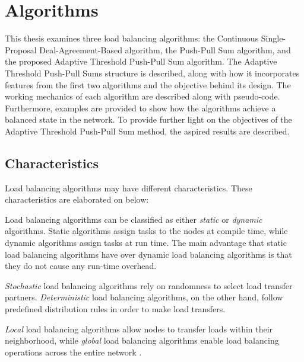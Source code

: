 \chapter{Algorithms}\label{chap:algorithms}
This thesis examines three load balancing algorithms: the Continuous Single-Proposal Deal-Agreement-Based algorithm, the Push-Pull Sum algorithm, and the proposed Adaptive Threshold Push-Pull Sum algorithm. The Adaptive Threshold Push-Pull Sums structure is described, along with how it incorporates features from the first two algorithms and the objective behind its design. The working mechanics of each algorithm are described along with pseudo-code. Furthermore, examples are provided to show how the algorithms achieve a balanced state in the network. To provide further light on the objectives of the Adaptive Threshold Push-Pull Sum method, the aspired results are described.

\section{Characteristics}\label{sec:algoCharacteristics}
Load balancing algorithms may have different characteristics. These characteristics are elaborated on below:

\begin{definition}
    Load balancing algorithms can be classified as either \textit{static} or \textit{dynamic} algorithms. Static algorithms assign tasks to the nodes at compile time, while dynamic algorithms assign tasks at run time. The main advantage that static load balancing algorithms have over dynamic load balancing algorithms is that they do not cause any run-time overhead. \cite{Bokhari}
\end{definition}

\begin{definition}
    \textit{Stochastic} load balancing algorithms rely on randomness to select load transfer partners. \textit{Deterministic} load balancing algorithms, on the other hand, follow predefined distribution rules in order to make load transfers. \cite{ChengzhongFrancis}
\end{definition}

\begin{definition}
    \textit{Local} load balancing algorithms allow nodes to transfer loads within their neighborhood, while \textit{global} load balancing algorithms enable load balancing operations across the entire network \cite{ChengzhongFrancis}.
\end{definition}


